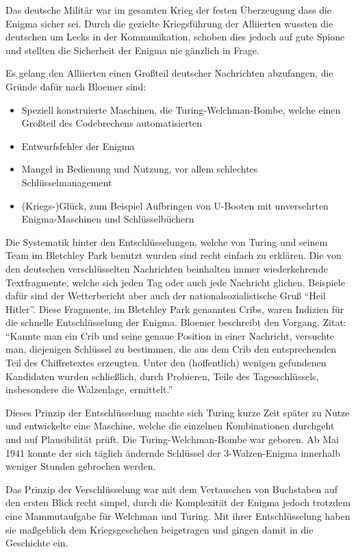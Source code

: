Das deutsche Militär war im gesamten Krieg der festen Überzeugung dass die Enigma sicher sei. \cite{bloemer_2012} Durch die gezielte Kriegsführung der Alliierten wussten die deutschen um Lecks in der Kommunikation, schoben dies jedoch auf gute Spione und stellten die Sicherheit der Enigma nie gänzlich in Frage. \cite{bloemer_2012}

Es gelang den Alliierten einen Großteil deutscher Nachrichten abzufangen, die Gründe dafür nach Bloemer sind: \cite{bloemer_2012}
\begin{itemize}
	\item Speziell konstruierte Maschinen, die Turing-Welchman-Bombe, welche einen Großteil des Codebrechens automatisierten
	\item Entwurfsfehler der Enigma
	\item Mangel in Bedienung und Nutzung, vor allem schlechtes Schlüsselmanagement
	\item (Kriegs-)Glück, zum Beispiel Aufbringen von U-Booten mit unversehrten Enigma-Maschinen und Schlüsselbüchern
\end{itemize}

Die Systematik hinter den Entschlüsselungen, welche von Turing und seinem Team im Bletchley Park benutzt wurden sind recht einfach zu erklären. Die von den deutschen verschlüsselten Nachrichten beinhalten immer wiederkehrende Textfragmente, welche sich jeden Tag oder auch jede Nachricht glichen. Beispiele dafür sind der Wetterbericht aber auch der nationalsozialistische Gruß \enquote{Heil Hitler}. \cite{bloemer_2012} Diese Fragmente, im Bletchley Park genannten Cribs, waren Indizien für die schnelle Entschlüsselung der Enigma. \cite{bloemer_2012} Bloemer beschreibt den Vorgang, Zitat: \enquote{Kannte man ein Crib und seine genaue Position in einer Nachricht, versuchte man, diejenigen Schlüssel zu bestimmen, die aus dem Crib den entsprechenden Teil des Chiffretextes erzeugten. Unter den (hoffentlich) wenigen gefundenen Kandidaten wurden schließlich, durch Probieren, Teile des Tagesschlüssels, insbesondere die Walzenlage, ermittelt.} \cite{bloemer_2012}

Dieses Prinzip der Entschlüsselung machte sich Turing kurze Zeit später zu Nutze und entwickelte eine Maschine, welche die einzelnen Kombinationen durchgeht und auf Plausibilität prüft. Die Turing-Welchman-Bombe war geboren. Ab Mai 1941 konnte der sich täglich ändernde Schlüssel der 3-Walzen-Enigma innerhalb weniger Stunden gebrochen werden. \cite{bloemer_2012}

Das Prinzip der Verschlüsselung war mit dem Vertauschen von Buchstaben auf den ersten Blick recht simpel, durch die Komplexität der Enigma jedoch trotzdem eine Mammutaufgabe für Welchman und Turing. Mit ihrer Entschlüsselung haben sie maßgeblich dem Kriegsgeschehen beigetragen und gingen damit in die Geschichte ein.


